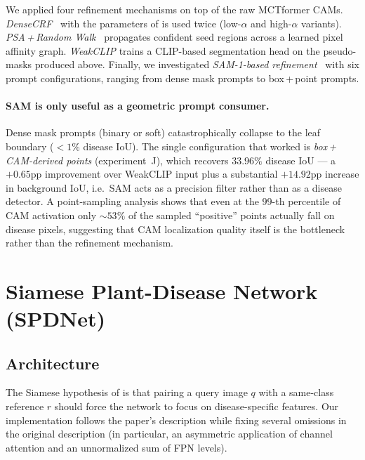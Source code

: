 \documentclass[11pt,a4paper]{article}
\begin{document}
We applied four refinement mechanisms on top of the raw MCTformer CAMs.
\emph{DenseCRF}~\citep{densecrf} with the parameters of
\citep{mctformer} is used twice (low-$\alpha$ and high-$\alpha$ variants).
\emph{PSA\,+\,Random Walk}~\citep{affinitynet} propagates confident
seed regions across a learned pixel affinity graph. \emph{WeakCLIP}
\citep{weakclip} trains a CLIP-based segmentation head on the
pseudo-masks produced above. Finally, we investigated \emph{SAM-1-based
refinement}~\citep{sam,sam_pseudo} with six prompt configurations,
ranging from dense mask prompts to box\,+\,point prompts.

\paragraph{SAM is only useful as a geometric prompt consumer.}
Dense mask prompts (binary or soft) catastrophically collapse to the
leaf boundary ($<\!1\%$ disease IoU). The single configuration that
worked is \emph{box\,+\,CAM-derived points} (experiment~J), which
recovers $33.96\%$ disease IoU — a $+0.65$pp improvement over WeakCLIP
input plus a substantial $+14.92$pp increase in background IoU,
i.e.\ SAM acts as a precision filter rather than as a disease detector.
A point-sampling analysis shows that even at the $99$-th percentile of
CAM activation only ${\sim}53\%$ of the sampled ``positive'' points
actually fall on disease pixels, suggesting that CAM localization
quality itself is the bottleneck rather than the refinement mechanism.

\section{Siamese Plant-Disease Network (SPDNet)}
\label{sec:spdnet}

\subsection{Architecture}

The Siamese hypothesis of \citep{spdnet} is that pairing a query image
$q$ with a same-class reference $r$ should force the network to focus
on disease-specific features. Our implementation follows the paper's
description while fixing several omissions in the original description
(in particular, an asymmetric application of channel attention and an
unnormalized sum of FPN levels).
\end{document}
